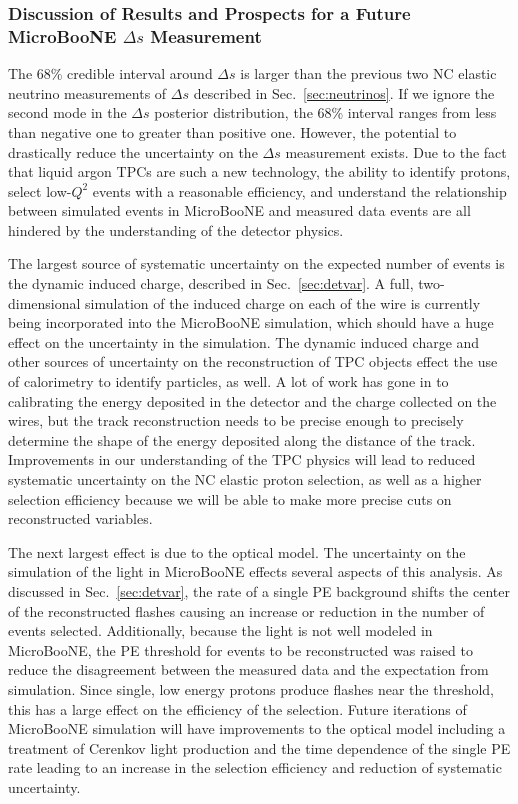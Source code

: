   \subsubsection{Discussion of Results and Prospects for a Future MicroBooNE $\Delta s$ Measurement}
    The 68\% credible interval around $\Delta s$ is larger than the previous
    two NC elastic neutrino measurements of $\Delta s$ described in
    Sec.~\ref{sec:neutrinos}. If we ignore the second mode in the $\Delta s$
    posterior distribution, the 68\% interval ranges from less than negative
    one to greater than positive one. However, the potential to drastically
    reduce the uncertainty on the $\Delta s$ measurement exists. Due to the
    fact that liquid argon TPCs are such a new technology, the ability to
    identify protons, select low-$Q^2$ events with a reasonable efficiency, and
    understand the relationship between simulated events in MicroBooNE and
    measured data events are all hindered by the understanding of the detector
    physics.

    The largest source of systematic uncertainty on the expected number of
    events is the dynamic induced charge, described in Sec.~\ref{sec:detvar}. A
    full, two-dimensional simulation of the induced charge on each of the wire
    is currently being incorporated into the MicroBooNE simulation, which
    should have a huge effect on the uncertainty in the simulation. The dynamic
    induced charge and other sources of uncertainty on the reconstruction of
    TPC objects effect the use of calorimetry to identify particles, as well. A
    lot of work has gone in to calibrating the energy deposited in the detector
    and the charge collected on the wires, but the track reconstruction needs
    to be precise enough to precisely determine the shape of the energy
    deposited along the distance of the track. Improvements in our
    understanding of the TPC physics will lead to reduced systematic
    uncertainty on the NC elastic proton selection, as well as a higher
    selection efficiency because we will be able to make more precise cuts on
    reconstructed variables.
    
    The next largest effect is due to the optical model. The uncertainty on the
    simulation of the light in MicroBooNE effects several aspects of this
    analysis. As discussed in Sec.~\ref{sec:detvar}, the rate of a single PE
    background shifts the center of the reconstructed flashes causing an
    increase or reduction in the number of events selected.  Additionally,
    because the light is not well modeled in MicroBooNE, the PE threshold for
    events to be reconstructed was raised to reduce the disagreement between
    the measured data and the expectation from simulation.  Since single, low
    energy protons produce flashes near the threshold, this has a large effect
    on the efficiency of the selection. Future iterations of MicroBooNE
    simulation will have improvements to the optical model including a
    treatment of Cerenkov light production and the time dependence of the
    single PE rate leading to an increase in the selection efficiency and
    reduction of systematic uncertainty.

